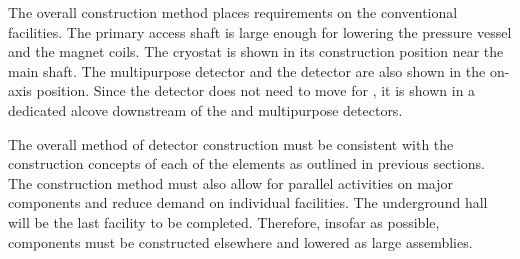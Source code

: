 The overall construction method places requirements on the conventional facilities. 
The primary access shaft is large enough for lowering the pressure vessel and the magnet coils. The  cryostat is shown in its construction position near the main shaft. The multipurpose detector and the  detector are also shown in the on-axis position. Since the  detector does not need to move for , it is shown in a dedicated alcove downstream of the  and multipurpose detectors.






The overall method of detector construction must be consistent with the construction concepts of each of the elements as outlined in previous sections. The construction method must also allow for parallel activities on major components and reduce demand on individual facilities. The underground hall will be the last facility to be completed. Therefore, insofar as possible, components must be constructed elsewhere and lowered as large assemblies.

